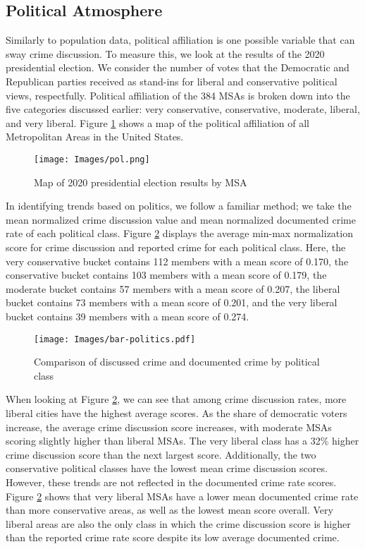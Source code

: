 \documentclass[12pt,oneside, letterpaper]{book}
\begin{document}
\subsection{Political Atmosphere}

\par Similarly to population data, political affiliation is one possible variable that can sway crime discussion. To measure this, we look at the results of the 2020 presidential election. We consider the number of votes that the Democratic and Republican parties received as stand-ins for liberal and conservative political views, respectfully. Political affiliation of the 384 MSAs is broken down into the five categories discussed earlier: very conservative, conservative, moderate, liberal, and very liberal. Figure \ref{fig:map-2} shows a map of the political affiliation of all Metropolitan Areas in the United States.

\begin{figure}[ht]
    \texttt{[image: Images/pol.png]}
    \caption{Map of 2020 presidential election results by MSA}
    \label{fig:map-2}
\end{figure}

\par In identifying trends based on politics, we follow a familiar method; we take the mean normalized crime discussion value and mean normalized documented crime rate of each political class. Figure \ref{fig:graph-2} displays the average min-max normalization score for crime discussion and reported crime for each political class. Here, the very conservative bucket contains 112 members with a mean score of 0.170, the conservative bucket contains 103 members with a mean score of 0.179, the moderate bucket contains 57 members with a mean score of 0.207, the liberal bucket contains 73 members with a mean score of 0.201, and the very liberal bucket contains 39 members with a mean score of 0.274.

\begin{figure}[ht]
    \centering
    \texttt{[image: Images/bar-politics.pdf]}
    \caption{Comparison of discussed crime and documented crime by political class}
    \label{fig:graph-2}
\end{figure}

\par When looking at Figure \ref{fig:graph-2}, we can see that among crime discussion rates, more liberal cities have the highest average scores. As the share of democratic voters increase, the average crime discussion score increases, with moderate MSAs scoring slightly higher than liberal MSAs. The very liberal class has a 32\% higher crime discussion score than the next largest score. Additionally, the two conservative political classes have the lowest mean crime discussion scores. However, these trends are not reflected in the documented crime rate scores. Figure \ref{fig:graph-2} shows that very liberal MSAs have a lower mean documented crime rate than more conservative areas, as well as the lowest mean score overall. Very liberal areas are also the only class in which the crime discussion score is higher than the reported crime rate score despite its low average documented crime.
\end{document}
